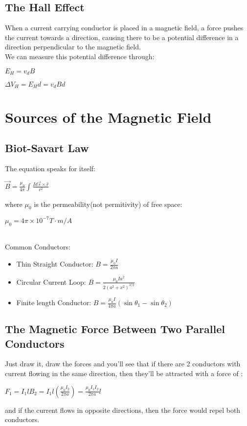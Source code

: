 \documentclass[12pt]{report}
\begin{document}
	\section{The Hall Effect}
		When a current carrying conductor is placed in a magnetic field, a force pushes the current towards a direction, causing there to be a potential difference in a direction perpendicular to the magnetic field.\\
		We can measure this potential difference through:\\
		\centerline{$E_H = v_dB$}
		\centerline{$\Delta V_H = E_Hd = v_dBd$}
\chapter{Sources of the Magnetic Field}
	\section{Biot-Savart Law}
		The equation speaks for itself:\\
		\centerline{$\vec{B} = \frac{\mu_0}{4\pi} \int_{}^{}\frac{Id\vec{s} \times \hat{r}}{r^2}$}
		where $\mu_0$ is the permeability(not permitivity) of free space:\\
		\centerline{$\mu_0 = 4\pi \times 10^{-7} T \cdot m/A$}
		\\
		Common Conductors:\\
		\begin{itemize}
			\item Thin Straight Conductor: $B = \frac{\mu_0 I}{2\pi a}$
			\item Circular Current Loop: $B = \frac{\mu_0 Ia^2}{2(a^2+x^2)^{3/2}}$
			\item Finite length Conductor: $B = \frac{\mu_0I}{4\pi a}(\sin \theta_1 - \sin \theta_2)$
		\end{itemize}
	\section{The Magnetic Force Between Two Parallel Conductors}
		Just draw it, draw the forces and you'll see that if there are 2 conductors with current flowing in the same direction, then they'll be attracted with a force of :\\
		\centerline{$F_1 = I_1lB_2 = I_1l(\frac{\mu_0I_2}{2\pi a}) = \frac{\mu_0I_1I_2}{2\pi a}l$}
		and if the current flows in opposite directions, then the force would repel both conductors.
\end{document}
